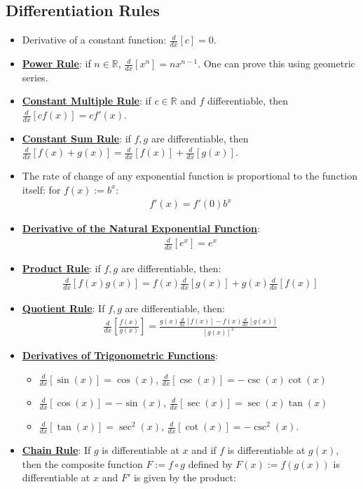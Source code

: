 \documentclass[11pt]{article}
\newcommand{\dfn}[1]{\underline{\textbf{#1}}}
\newcommand{\R}[0]{\mathbb{R}}
\newcommand{\deriv}[1]{\frac{d}{dx} \left[ #1 \right]}
\begin{document}
\subsection{Differentiation Rules}
\begin{itemize}[noitemsep]
	\item Derivative of a constant function: $\deriv{c} = 0$. 
	\item \dfn{Power Rule}: if $n \in \R$, $\deriv{x^n} = nx^{n-1}$. One can prove this using geometric series. 
	\item \dfn{Constant Multiple Rule}: if $c \in \R$ and $f$ differentiable, then $\deriv{cf(x)} = cf'(x)$. 
	\item \dfn{Constant Sum Rule}: if $f, g$ are differentiable, then $\deriv{f(x) + g(x)} = \deriv{f(x)} + \deriv{g(x)}$. 
	\item The rate of change of any exponential function is proportional to the function itself: for $f(x) := b^x$:
	\begin{align}
		f'(x) = f'(0) b^x	
	\end{align}
	\item \dfn{Derivative of the Natural Exponential Function}: 
	\begin{align}
		\deriv{e^x} = e^x 	
	\end{align}
	\item \dfn{Product Rule}: if $f, g$ are differentiable, then: 
	\begin{align}
		\deriv{f(x) g(x) } = f(x) \deriv{g(x)} + g(x) \deriv{f(x)} 	
	\end{align}
	\item \dfn{Quotient Rule}: If $f, g$ are differentiable, then: 
	\begin{align}
		\deriv{ \frac{f(x)}{g(x)} } = \frac{g(x) \deriv{f(x)} - f(x) \deriv{g(x)}}{[g(x)]^2}	
	\end{align}
	\item \dfn{Derivatives of Trigonometric Functions}: 
	\begin{itemize}[noitemsep]
		\item $\deriv{ \sin(x) } = \cos (x) $, $\deriv{ \csc(x) } = - \csc(x) \cot (x) $ 
		\item $\deriv{\cos(x) } = - \sin(x)$, $\deriv{\sec(x)} = \sec(x) \tan (x)$
		\item $\deriv{ \tan(x) } = \sec^2 (x)$, $ \deriv{\cot(x)} = - \csc^2 (x)$.
	\end{itemize}
	\item \dfn{Chain Rule}: If $g$ is differentiable at $x$ and if $f$ is differentiable at $g(x)$, then the composite function $F := f \circ g$ defined by $F(x) := f(g(x))$ is differentiable at $x$ and $F'$ is given by the product: 

\end{itemize}
\end{document}
